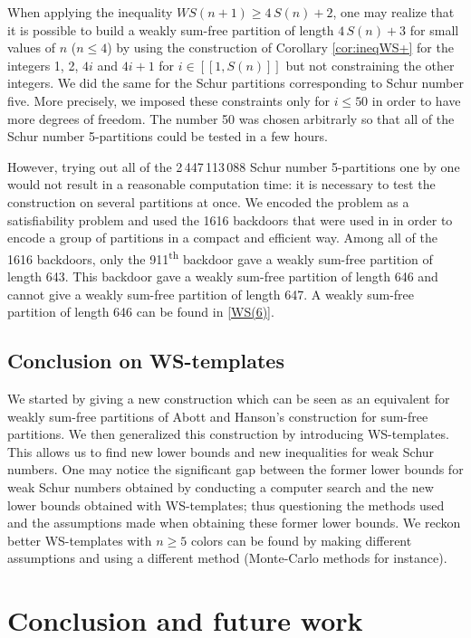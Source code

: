 \documentclass{article}
\newtheorem{computational theorem}[definition]{Computational Theorem}
\newcommand{\WS}{\mathit{WS}}
\begin{document}
When applying the inequality \(\WS(n+1) \geqslant 4 \, S(n) + 2\), one may realize that it is possible to build a weakly 
sum-free partition of length \(4 \, S(n) + 3\) for small values of \(n\) (\(n \leqslant 4\)) by using the construction of 
Corollary \ref{cor:ineqWS+} for the integers 1, 2, \(4i\) and \(4i+1\) for \(i \in [\![1, S(n)]\!]\) but not 
constraining the other integers. We did the same for the Schur partitions corresponding to Schur number five. More precisely, 
we imposed these constraints only for \(i \leqslant 50\) in order to have more degrees of freedom. The number 50 was chosen 
arbitrarly so that all of the Schur number 5-partitions could be tested in a few hours.

However, trying out all of the 2\,447\,113\,088 Schur number 5-partitions \cite{Heule2017} one by one would not result in a 
reasonable computation time: it is necessary to test the construction on several partitions at once. We encoded the problem as a 
satisfiability problem and used the 1616 backdoors that were used in \cite{Heule2017} in order to encode a group of partitions in 
a compact and efficient way. Among all of the 1616 backdoors, only the 911\textsuperscript{th} backdoor gave a weakly sum-free 
partition of length 643. This backdoor gave a weakly sum-free partition of length 646 and cannot give a weakly sum-free 
partition of length 647. A weakly sum-free partition of length 646 can be found in \ref{WS(6)}.


\subsection{Conclusion on WS-templates}

We started by giving a new construction which can be seen as an equivalent for weakly sum-free partitions of Abott
and Hanson's construction for sum-free partitions. We then generalized this construction by introducing WS-templates. This
allows us to find new lower bounds and new inequalities for weak Schur numbers. One may notice the significant gap
between the former lower bounds for weak Schur numbers obtained by conducting a computer search and the new lower bounds
obtained with WS-templates; thus questioning the methods used and the assumptions made when obtaining these former lower 
bounds. We reckon better WS-templates with \(n \geqslant 5\) colors can be found by making different assumptions 
and using a different method (Monte-Carlo methods for instance).


\section{Conclusion and future work}
\end{document}
